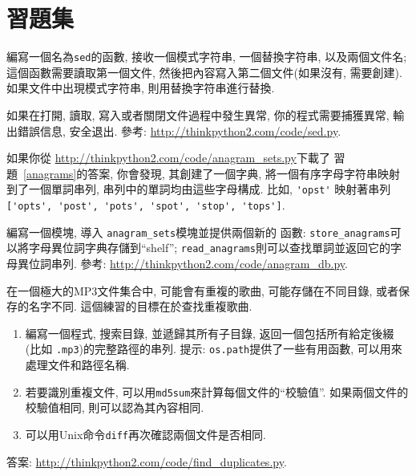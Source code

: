 \documentclass[10pt]{book}
\begin{document}
\section{習題集}

\begin{exercise}

編寫一個名為{\tt sed}的函數, 接收一個模式字符串, 一個替換字符串, 以及兩個文件名;
這個函數需要讀取第一個文件, 然後把內容寫入第二個文件(如果沒有, 需要創建).
如果文件中出現模式字符串, 則用替換字符串進行替換. 

如果在打開, 讀取, 寫入或者關閉文件過程中發生異常, 
你的程式需要捕獲異常, 輸出錯誤信息, 安全退出. 
參考: \url{http://thinkpython2.com/code/sed.py}.

\end{exercise}


\begin{exercise}

如果你從 \url{http://thinkpython2.com/code/anagram_sets.py}下載了
習題~\ref{anagrams}的答案, 你會發現, 
其創建了一個字典, 將一個有序字母字符串映射到了一個單詞串列, 
串列中的單詞均由這些字母構成. 比如,
\verb"'opst'" 映射著串列
\verb"['opts', 'post', 'pots', 'spot', 'stop', 'tops']".

編寫一個模塊, 導入 \verb"anagram_sets"模塊並提供兩個新的
函數: \verb"store_anagrams"可以將字母異位詞字典存儲到``shelf''; 
\verb"read_anagrams"則可以查找單詞並返回它的字母異位詞串列. 
參考: \url{http://thinkpython2.com/code/anagram_db.py}.

\end{exercise}


\begin{exercise}
\label{checksum}

在一個極大的MP3文件集合中, 可能會有重複的歌曲, 可能存儲在不同目錄, 
或者保存的名字不同. 
這個練習的目標在於查找重複歌曲. 

\begin{enumerate}

\item 編寫一個程式, 搜索目錄, 並遞歸其所有子目錄, 
返回一個包括所有給定後綴 (比如 {\tt .mp3})的完整路徑的串列. 
提示: {\tt os.path}提供了一些有用函數, 可以用來處理文件和路徑名稱. 

\item 若要識別重複文件, 可以用{\tt md5sum}來計算每個文件的``校驗值''. 
如果兩個文件的校驗值相同, 則可以認為其內容相同. 

\item 可以用Unix命令{\tt diff}再次確認兩個文件是否相同. 

\end{enumerate}

答案: \url{http://thinkpython2.com/code/find_duplicates.py}.

\end{exercise}
\end{document}
